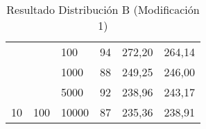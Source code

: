 \documentclass{article}
\begin{document}
\begin{table}[h]
\begin{tabular}{llllll}
			&                                                                       &                                                                           &                                                                              &                                                                                     &                                                                                       \\ \hline
			\multicolumn{1}{|l|}{}                                                 & \multicolumn{1}{l|}{}                                                 & \multicolumn{1}{l|}{100}                                                  & \multicolumn{1}{l|}{94}                                                      & \multicolumn{1}{l|}{272,20}                                                         & \multicolumn{1}{l|}{264,14}                                                           \\ \cline{3-6} 
			\multicolumn{1}{|l|}{}                                                 & \multicolumn{1}{l|}{}                                                 & \multicolumn{1}{l|}{1000}                                                 & \multicolumn{1}{l|}{88}                                                      & \multicolumn{1}{l|}{249,25}                                                         & \multicolumn{1}{l|}{246,00}                                                           \\ \cline{3-6} 
			\multicolumn{1}{|l|}{}                                                 & \multicolumn{1}{l|}{}                                                 & \multicolumn{1}{l|}{5000}                                                 & \multicolumn{1}{l|}{92}                                                      & \multicolumn{1}{l|}{238,96}                                                         & \multicolumn{1}{l|}{243,17}                                                           \\ \cline{3-6} 
			\multicolumn{1}{|l|}{\multirow{-4}{*}{10}}                             & \multicolumn{1}{l|}{\multirow{-4}{*}{100}}                            & \multicolumn{1}{l|}{10000}                                                & \multicolumn{1}{l|}{87}                                                      & \multicolumn{1}{l|}{235,36}                                                         & \multicolumn{1}{l|}{238,91}                                                           \\ \hline
		\end{tabular}
	\caption{Resultado Distribución B (Modificación 1)}
	\end{table} 
\end{document}

